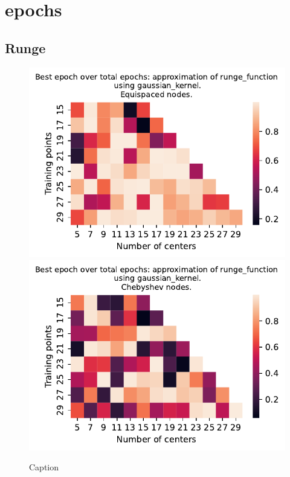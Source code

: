 \documentclass[12pt]{report} %
\begin{document}
\section*{epochs}

\subsection*{Runge}

\begin{figure}[ht]
  \centering

  \includegraphics[width=.49\textwidth]{imagenes/experiments/1d/variational_epochs/runge_function-Kgaussian_kernel-Equi-epochs.pdf}
  \includegraphics[width=.49\textwidth]{imagenes/experiments/1d/variational_epochs/runge_function-Kgaussian_kernel-Cheb-epochs.pdf}
  \caption{Caption}
  \label{fig:epochs-runge-gaussian}
\end{figure}
\end{document}
